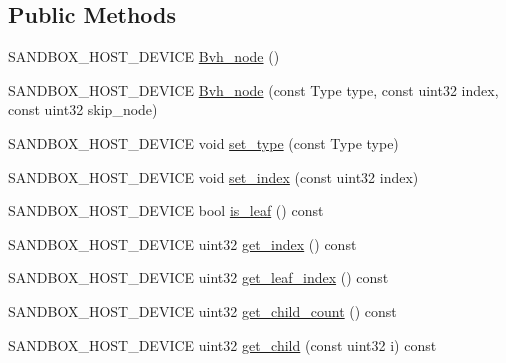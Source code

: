 \subsection*{Public Methods}
\begin{DoxyCompactItemize}
\item 
S\+A\+N\+D\+B\+O\+X\+\_\+\+H\+O\+S\+T\+\_\+\+D\+E\+V\+I\+CE \hyperlink{structsandbox_1_1_bvh__node_3_01_indexed__leaf__bvh__tag_01_4_ad1bd8852582c16847eb047d9671d85df}{Bvh\+\_\+node} ()
\item 
S\+A\+N\+D\+B\+O\+X\+\_\+\+H\+O\+S\+T\+\_\+\+D\+E\+V\+I\+CE \hyperlink{structsandbox_1_1_bvh__node_3_01_indexed__leaf__bvh__tag_01_4_a5483abafea181c15a91f66da9e2c8580}{Bvh\+\_\+node} (const Type type, const uint32 index, const uint32 skip\+\_\+node)
\item 
S\+A\+N\+D\+B\+O\+X\+\_\+\+H\+O\+S\+T\+\_\+\+D\+E\+V\+I\+CE void \hyperlink{structsandbox_1_1_bvh__node_3_01_indexed__leaf__bvh__tag_01_4_aadeed3dd5e0241ed9514c6eb1e68be89}{set\+\_\+type} (const Type type)
\item 
S\+A\+N\+D\+B\+O\+X\+\_\+\+H\+O\+S\+T\+\_\+\+D\+E\+V\+I\+CE void \hyperlink{structsandbox_1_1_bvh__node_3_01_indexed__leaf__bvh__tag_01_4_aa5e707c983b73fc560880dcdeaae03b7}{set\+\_\+index} (const uint32 index)
\item 
S\+A\+N\+D\+B\+O\+X\+\_\+\+H\+O\+S\+T\+\_\+\+D\+E\+V\+I\+CE bool \hyperlink{structsandbox_1_1_bvh__node_3_01_indexed__leaf__bvh__tag_01_4_a5a769f5a9de50ececbecc6c1a44821ba}{is\+\_\+leaf} () const
\item 
S\+A\+N\+D\+B\+O\+X\+\_\+\+H\+O\+S\+T\+\_\+\+D\+E\+V\+I\+CE uint32 \hyperlink{structsandbox_1_1_bvh__node_3_01_indexed__leaf__bvh__tag_01_4_a8404398ddc749e7d9d3ab1196d16fde1}{get\+\_\+index} () const
\item 
S\+A\+N\+D\+B\+O\+X\+\_\+\+H\+O\+S\+T\+\_\+\+D\+E\+V\+I\+CE uint32 \hyperlink{structsandbox_1_1_bvh__node_3_01_indexed__leaf__bvh__tag_01_4_a24705a2ca7c24273af025f2400bf47e1}{get\+\_\+leaf\+\_\+index} () const
\item 
S\+A\+N\+D\+B\+O\+X\+\_\+\+H\+O\+S\+T\+\_\+\+D\+E\+V\+I\+CE uint32 \hyperlink{structsandbox_1_1_bvh__node_3_01_indexed__leaf__bvh__tag_01_4_af1e3fb80fb7434c8c5234532b3be2b5e}{get\+\_\+child\+\_\+count} () const
\item 
S\+A\+N\+D\+B\+O\+X\+\_\+\+H\+O\+S\+T\+\_\+\+D\+E\+V\+I\+CE uint32 \hyperlink{structsandbox_1_1_bvh__node_3_01_indexed__leaf__bvh__tag_01_4_a9bce7fdafbe100901b8779683ed2b9a5}{get\+\_\+child} (const uint32 i) const
\end{DoxyCompactItemize}
